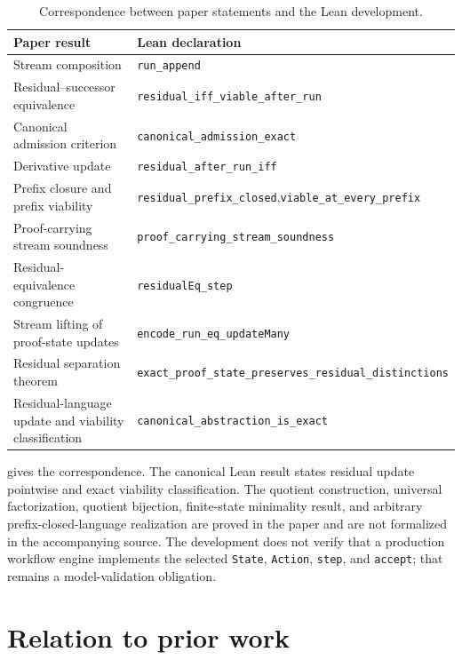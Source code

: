 \documentclass[11pt]{article}
\theoremstyle{definition}
\begin{document}
\begin{table}[H]
\centering
\scriptsize
\begin{tabular}{p{}p{}}
\toprule
\textbf{Paper result} & \textbf{Lean declaration}\\
\midrule
Stream composition & \texttt{run\_append}\\
Residual--successor equivalence & \texttt{residual\_iff\_viable\_after\_run}\\
Canonical admission criterion & \texttt{canonical\_admission\_exact}\\
Derivative update & \texttt{residual\_after\_run\_iff}\\
Prefix closure and prefix viability & \texttt{residual\_prefix\_closed},\newline \texttt{viable\_at\_every\_prefix}\\
Proof-carrying stream soundness & \texttt{proof\_carrying\_stream\_soundness}\\
Residual-equivalence congruence & \texttt{residualEq\_step}\\
Stream lifting of proof-state updates & \texttt{encode\_run\_eq\_updateMany}\\
Residual separation theorem & \texttt{exact\_proof\_state\_preserves\_}\newline \texttt{residual\_distinctions}\\
Residual-language update and viability classification & \texttt{canonical\_abstraction\_is\_exact}\\
\bottomrule
\end{tabular}
\caption{Correspondence between paper statements and the Lean development.}
\label{tab:lean-map}
\end{table}

 gives the correspondence. The canonical Lean result states residual update pointwise and exact viability classification. The quotient construction, universal factorization, quotient bijection,
finite-state minimality result, and arbitrary prefix-closed-language realization are proved in the paper and are not formalized in the accompanying source. The development does not verify that a production workflow engine implements the selected \texttt{State},
\texttt{Action}, \texttt{step}, and \texttt{accept}; that remains a model-validation obligation.




\section{Relation to prior work}\label{sec:related}
\end{document}
